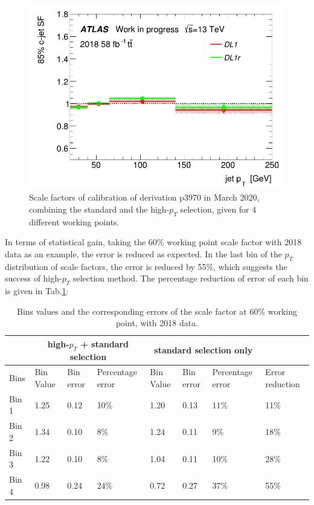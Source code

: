 \documentclass[letterpaper,12pt]{article}
\begin{document}
\begin{figure}[H]
\begin{minipage}[b]{.45\textwidth}
\end{minipage}\hfill
\begin{minipage}[b]{.45\textwidth}
\centering
\includegraphics[width=1\textwidth]{March_highpT/SF85.png}
\end{minipage}
\caption{Scale factors of calibration of derivation p3970 in March 2020, combining the standard and the high-$p_{T}$ selection, given for  4 different working points.} \label{fig:March_highpT}
\end{figure}



In terms of statistical gain, taking the 60\% working point scale factor with 2018 data as an example, the error is reduced as expected. In the last bin of the $p_{T}$ distribution of scale factors, the error is reduced by 55\%, which suggests the success of high-$p_{T}$ selection method. The percentage reduction of error of each bin is given in Tab.\ref{tab:limit}:


 \begin{table}[h]
 \begin{centering}
 \begin{tabular}{|p{2.5em}||p{2.5em}|p{2.5em}|p{5em}||p{2.5em}|p{2.5em}|p{5em}||p{5em}|}
          \hline
          & \multicolumn{3}{|c||}{high-$p_{T}$ + standard selection} & \multicolumn{3}{|c||}{standard selection only} & \\  \hline\hline
          Bins& Bin Value &Bin error&Percentage error&Bin Value &Bin error&Percentage error & Error reduction\\ \hline
          Bin 1 & 1.25 & 0.12 & 10\% &1.20 & 0.13 & 11\% & 11\% \\ \hline
          Bin 2 & 1.34 & 0.10 & 8\% & 1.24 & 0.11 & 9\% & 18\% \\ \hline
          Bin 3 & 1.22 & 0.10 & 8\% & 1.04 & 0.11 & 10\% & 28\% \\ \hline
          Bin 4 & 0.98 & 0.24 & 24\% & 0.72 & 0.27 & 37\% & 55\% \\ \hline
          
 
 \end{tabular} 
 \caption{Bins values and the corresponding errors of the scale factor at 60\% working point, with 2018 data.}
 \end{centering}
 \label{tab:limit}
 \end{table}
\end{document}
